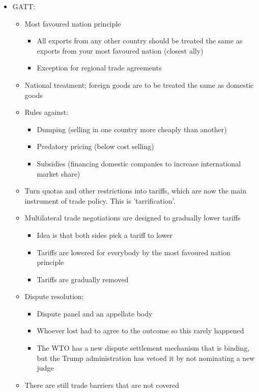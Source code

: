 \documentclass[11pt]{article}
\begin{document}
\begin{itemize}
\begin{itemize}
\begin{itemize}
\end{itemize}
\item GATT:
\begin{itemize}
\item Most favoured nation principle
\begin{itemize}
\item All exports from any other country should be treated the same as
exports from your most favoured nation (closest ally)
\item Exception for regional trade agreements
\end{itemize}
\item National treatment; foreign goods are to be treated the same as
domestic goods
\item Rules against:
\begin{itemize}
\item Dumping (selling in one country more cheaply than another)
\item Predatory pricing (below cost selling)
\item Subsidies (financing domestic companies to increase international
market share)
\end{itemize}
\item Turn quotas and other restrictions into tariffs, which are now the
main instrument of trade policy. This is 'tarrification'.
\item Multilateral trade negotiations are designed to gradually lower tariffs
\begin{itemize}
\item Idea is that both sides pick a tariff to lower
\item Tariffs are lowered for everybody by the most favoured nation principle
\item Tariffs are gradually removed
\end{itemize}
\item Dispute resolution:
\begin{itemize}
\item Dispute panel and an appellate body
\item Whoever lost had to agree to the outcome so this rarely happened
\item The WTO has a new dispute settlement mechanism that is binding, but
the Trump administration has vetoed it by not nominating a new judge
\end{itemize}
\item There are still trade barriers that are not covered
\begin{itemize}

\end{itemize}
\end{itemize}
\end{itemize}
\end{itemize}
\end{document}

